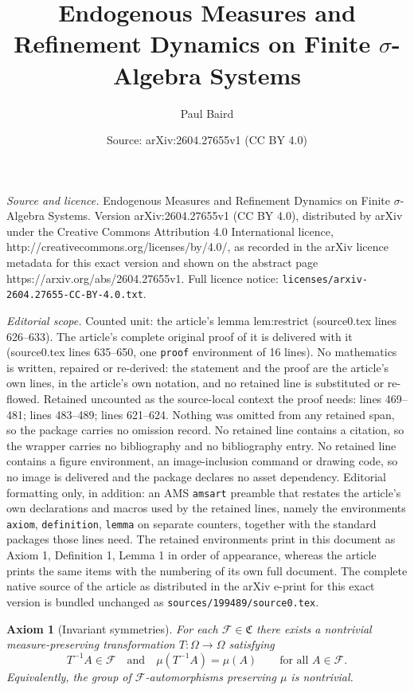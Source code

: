 \documentclass[10pt,a4paper]{amsart}
\title{Endogenous Measures and Refinement Dynamics on Finite $\sigma$-Algebra Systems}
\author{Paul Baird}
\date{Source: arXiv:2604.27655v1 (CC BY 4.0)}
\newtheorem{axiom}{Axiom}
\begin{document}
\maketitle

\noindent\emph{Source and licence.} Endogenous Measures and Refinement Dynamics on Finite $\sigma$-Algebra Systems. Version arXiv:2604.27655v1 (CC BY 4.0), distributed by arXiv under the Creative Commons Attribution 4.0 International licence, http://creativecommons.org/licenses/by/4.0/, as recorded in the arXiv licence metadata for this exact version and shown on the abstract page https://arxiv.org/abs/2604.27655v1. Full licence notice: \texttt{licenses/arxiv-2604.27655-CC-BY-4.0.txt}.\par\smallskip

\noindent\textit{Editorial scope.} Counted unit: the article's lemma lem:restrict (source0.tex lines 626--633). The article's complete original proof of it is delivered with it (source0.tex lines 635--650, one \texttt{proof} environment of 16 lines). No mathematics is written, repaired or re-derived: the statement and the proof are the article's own lines, in the article's own notation, and no retained line is substituted or re-flowed.  Retained uncounted as the source-local context the proof needs: lines 469--481; lines 483--489; lines 621--624.  Nothing was omitted from any retained span, so the package carries no omission record.  No retained line contains a citation, so the wrapper carries no bibliography and no bibliography entry.  No retained line contains a figure environment, an image-inclusion command or drawing code, so no image is delivered and the package declares no asset dependency.  Editorial formatting only, in addition: an AMS \texttt{amsart} preamble that restates the article's own declarations and macros used by the retained lines, namely the environments \texttt{axiom}, \texttt{definition}, \texttt{lemma} on separate counters, together with the standard packages those lines need.  The retained environments print in this document as Axiom 1, Definition 1, Lemma 1 in order of appearance, whereas the article prints the same items with the numbering of its own full document.  The complete native source of the article as distributed in the arXiv e-print for this exact version is bundled unchanged as \texttt{sources/199489/source0.tex}.
\begin{axiom}[Invariant symmetries]\label{ax:B}
For each $\mathcal F\in\mathfrak C$ there exists a nontrivial
measure-preserving transformation
$T:\Omega\to\Omega$ satisfying
\[
T^{-1}A\in\mathcal F
\quad\text{and}\quad
\mu(T^{-1}A)=\mu(A)
\qquad\text{for all }A\in\mathcal F .
\]
Equivalently, the group of $\mathcal F$-automorphisms preserving $\mu$
is nontrivial.
\end{axiom}
\end{document}
